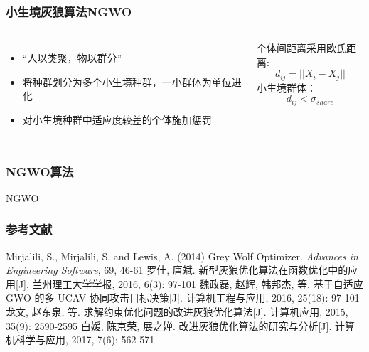 \begin{frame}
	\frametitle{小生境灰狼算法NGWO}
	\begin{columns}
	\begin{itemize}
		\item {“人以类聚，物以群分”}
		\item {将种群划分为多个小生境种群，一小群体为单位进化}
		\item {对小生境种群中适应度较差的个体施加惩罚}
	\end{itemize}
	个体间距离采用欧氏距离:
	$$d_{ij}=||X_i-X_j||$$
	小生境群体：
	$$d_{ij} < \sigma_{share}$$
	\end{columns}	
\end{frame}


\begin{frame}
	\frametitle{NGWO算法}
	\begin{algorithm}[H]
	\caption{NGWO}\label{nwolf_alg}
	 \scriptsize
		\begin{algorithmic}
				\ENDFOR
				\ENDIF
			\ENDWHILE
		\end{algorithmic}
	\end{algorithm}
\end{frame}


\begin{frame}
	\frametitle{参考文献}
	\begin{thebibliography}{99} 
	 Mirjalili, S., Mirjalili, S. and Lewis, A. (2014) Grey Wolf Optimizer. \emph{Advances in Engineering Software}, 69, 46-61
	 罗佳, 唐斌. 新型灰狼优化算法在函数优化中的应用[J]. 兰州理工大学学报, 2016, 6(3): 97-101  
	 魏政磊, 赵辉, 韩邦杰, 等. 基于自适应 GWO 的多 UCAV 协同攻击目标决策[J]. 计算机工程与应用, 2016, 25(18): 97-101
	 龙文, 赵东泉, 等. 求解约束优化问题的改进灰狼优化算法[J]. 计算机应用, 2015, 35(9): 2590-2595
	 白媛, 陈京荣, 展之婵. 改进灰狼优化算法的研究与分析[J]. 计算机科学与应用, 2017, 7(6): 562-571
	\end{thebibliography}
\end{frame}